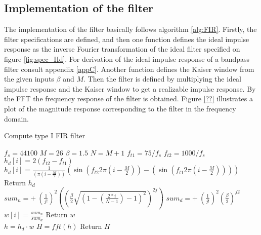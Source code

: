 \subsection{Implementation of the filter}
The implementation of the filter basically follows algorithm \ref{alg:FIR}. Firstly, the filter specifications are defined, and then one function defines the ideal impulse response as the inverse Fourier transformation of the ideal filter specified on figure \ref{fig:spec_Hd}. For derivation of the ideal impulse response of a bandpass filter consult appendix \ref{appC}. Another function defines the Kaiser window from the given inputs $\beta$ and $M$. Then the filter is defined by multiplying the ideal impulse response and the Kaiser window to get a realizable impulse response. By the FFT the frequency response of the filter is obtained. Figure \ref{??}  illustrates a plot of the magnitude response corresponding to the filter in the frequency domain.   

\begin{algorithm}[H]
\caption{Compute type I FIR filter}
\label{alg:FIR}
\begin{algorithmic}[1] 
\State $f_s= 44100$ 
\State $M = 26$  
\State $\beta = 1.5$ 
\State $N = M+1$ 
\State $f_{t1} = 75/f_s$ 
\State $f_{t2} = 1000/f_s$ 
\\
        		\State $h_d[i] = 2(f_{t2} - f_{t1})$
        	\Else 
        		\State  $h_d[i] = \frac{1}{ (\pi (i - \frac{M}{2}))}(\sin(f_{t2} 2 \pi (i - \frac{M}{2})) - (\sin(f_{t1} 2 \pi (i - \frac{M}{2}))))$ 
        	\EndIf 
	\EndFor
	\State Return $h_d$
\EndProcedure
\\
			\State $ sum_n = + \ (\frac{1}{j!})^2 \left( \left( \frac{\beta}{2} \sqrt{\left(1 - \left( \frac{2*i}{N-1}\right) - 1\right)^2}\right)^{2j}\right)$
			\State $ sum_d = + \ (\frac{1}{j!})^2 \left( \frac{\beta}{2}\right)^{j2}$
		\EndFor
		\State $w[i]=\frac{sum_n}{sum_d}$
	\EndFor
	\State Return $w$
\EndProcedure
\\
	\State $h = h_d \cdot w$ 
	\State $H = fft(h)$ 
	\State Return $H$
\EndProcedure

\end{algorithmic}
\end{algorithm}

